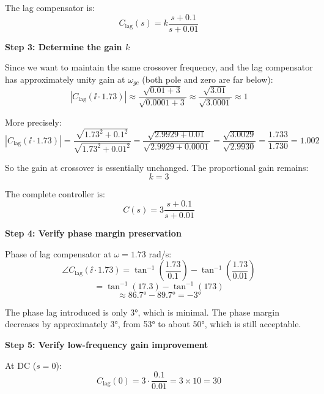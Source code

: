 \documentclass[11pt,a4paper]{article}
\begin{document}
The lag compensator is:
\begin{equation}
  C_{\text{lag}}(s) = k\frac{s + 0.1}{s + 0.01}
\end{equation}

\textbf{Step 3: Determine the gain $k$}

Since we want to maintain the same crossover frequency, and the lag compensator has approximately unity gain at $\omega_{gc}$ (both pole and zero are far below):
\begin{equation}
  |C_{\text{lag}}(\ii \cdot 1.73)| \approx \frac{\sqrt{0.01 + 3}}{\sqrt{0.0001 + 3}} \approx \frac{\sqrt{3.01}}{\sqrt{3.0001}} \approx 1
\end{equation}

More precisely:
\begin{equation}
  |C_{\text{lag}}(\ii \cdot 1.73)| = \frac{\sqrt{1.73^2 + 0.1^2}}{\sqrt{1.73^2 + 0.01^2}} = \frac{\sqrt{2.9929 + 0.01}}{\sqrt{2.9929 + 0.0001}} = \frac{\sqrt{3.0029}}{\sqrt{2.9930}} = \frac{1.733}{1.730} = 1.002
\end{equation}

So the gain at crossover is essentially unchanged. The proportional gain remains:
\begin{equation}
  k = 3
\end{equation}

The complete controller is:
\begin{equation}
  C(s) = 3\frac{s + 0.1}{s + 0.01}
\end{equation}

\textbf{Step 4: Verify phase margin preservation}

Phase of lag compensator at $\omega = 1.73$ rad/s:
\begin{equation}
  \angle C_{\text{lag}}(\ii \cdot 1.73) = \tan^{-1}\left(\frac{1.73}{0.1}\right) - \tan^{-1}\left(\frac{1.73}{0.01}\right)
\end{equation}
\begin{equation}
  = \tan^{-1}(17.3) - \tan^{-1}(173)
\end{equation}
\begin{equation}
  \approx 86.7° - 89.7° = -3°
\end{equation}

The phase lag introduced is only 3°, which is minimal. The phase margin decreases by approximately 3°, from 53° to about 50°, which is still acceptable.

\textbf{Step 5: Verify low-frequency gain improvement}

At DC ($s = 0$):
\begin{equation}
  C_{\text{lag}}(0) = 3 \cdot \frac{0.1}{0.01} = 3 \times 10 = 30
\end{equation}
\end{document}
